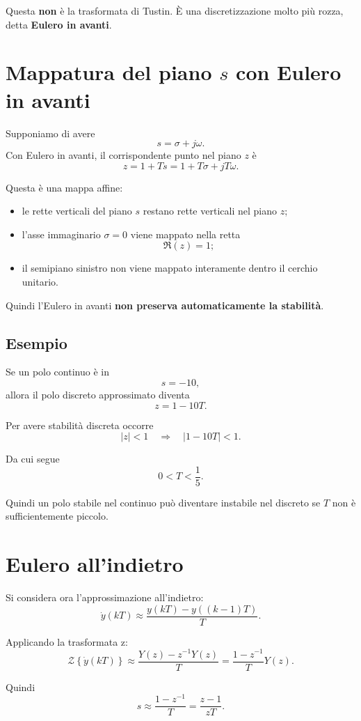 Questa \textbf{non} \`e la trasformata di Tustin.
\`E una discretizzazione molto pi\`u rozza, detta \textbf{Eulero in avanti}.

\section{Mappatura del piano \(s\) con Eulero in avanti}

Supponiamo di avere
\[
s=\sigma+j\omega.
\]
Con Eulero in avanti, il corrispondente punto nel piano \(z\) \`e
\[
z=1+Ts = 1+T\sigma + jT\omega.
\]

Questa \`e una mappa affine:
\begin{itemize}
    \item le rette verticali del piano \(s\) restano rette verticali nel piano \(z\);
    \item l'asse immaginario \(\sigma=0\) viene mappato nella retta
    \[
    \Re(z)=1;
    \]
    \item il semipiano sinistro non viene mappato interamente dentro il cerchio unitario.
\end{itemize}

Quindi l'Eulero in avanti \textbf{non preserva automaticamente la stabilit\`a}.

\subsection{Esempio}

Se un polo continuo \`e in
\[
s=-10,
\]
allora il polo discreto approssimato diventa
\[
z=1-10T.
\]

Per avere stabilit\`a discreta occorre
\[
|z|<1
\quad\Longrightarrow\quad
|1-10T|<1.
\]

Da cui segue
\[
0<T<\frac{1}{5}.
\]

Quindi un polo stabile nel continuo pu\`o diventare instabile nel discreto
se \(T\) non \`e sufficientemente piccolo.

\section{Eulero all'indietro}

Si considera ora l'approssimazione all'indietro:
\[
\dot y(kT)\approx \frac{y(kT)-y((k-1)T)}{T}.
\]

Applicando la trasformata z:
\[
\mathcal{Z}\left\{\dot y(kT)\right\}
\approx
\frac{Y(z)-z^{-1}Y(z)}{T}
=
\frac{1-z^{-1}}{T}Y(z).
\]

Quindi
\[
s \approx \frac{1-z^{-1}}{T}
=
\frac{z-1}{zT}.
\]

